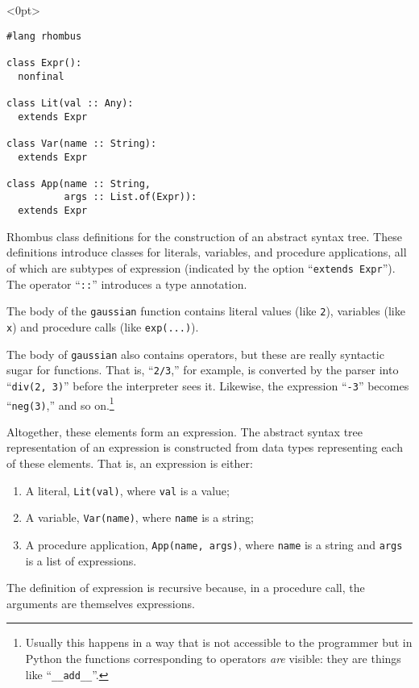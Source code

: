 \documentclass[11pt, a4paper]{article}
\newcommand{\cd}[1]{\texttt{#1}}
\begin{document}
\begin{marginfigure}<0pt>
  \footnotesize
\begin{verbatim}
#lang rhombus

class Expr():
  nonfinal

class Lit(val :: Any):
  extends Expr

class Var(name :: String):
  extends Expr

class App(name :: String,
          args :: List.of(Expr)):
  extends Expr
\end{verbatim}
  \caption{Rhombus class definitions for the construction of an
    abstract syntax tree. These definitions introduce classes for
    literals, variables, and procedure applications, all of which are
    subtypes of expression (indicated by the option ``\cd{extends
      Expr}''). The operator ``\cd{::}'' introduces a type
    annotation.\label{fig:class-defs}}
\end{marginfigure}
The body of the \cd{gaussian} function contains literal values (like
\cd{2}), variables (like \cd{x}) and procedure calls (like
\cd{exp(...)}).

The body of \cd{gaussian} also contains operators, but these are
really syntactic sugar for functions. That is, ``\cd{2/3},'' for
example, is converted by the parser into ``\cd{div(2, 3)}'' before the
interpreter sees it. Likewise, the expression ``\cd{-3}'' becomes
``\cd{neg(3)},'' and so on.\footnote{Usually this happens in a way
  that is not accessible to the programmer but in Python the functions
  corresponding to operators \emph{are} visible: they are things like
  ``\cd{__add__}''.}

Altogether, these elements form an expression. The abstract syntax
tree representation of an expression is constructed from data types
representing each of these elements. That is, an expression is either:
\begin{enumerate}
\item A literal, \cd{Lit(val)}, where \cd{val} is a value;
\item A variable, \cd{Var(name)}, where \cd{name} is a string; 
\item A procedure application, \cd{App(name, args)}, where \cd{name}
  is a string and \cd{args} is a list of expressions.
\end{enumerate}
The definition of expression is recursive because, in a procedure
call, the arguments are themselves expressions.
\end{document}
